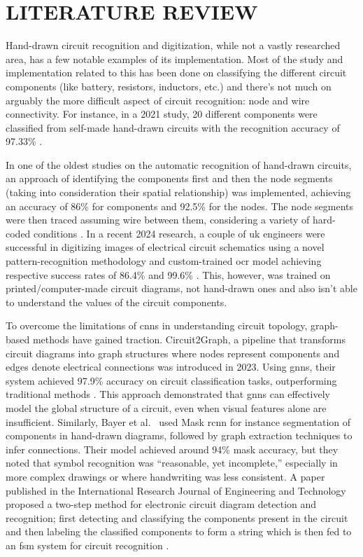 \chapter{LITERATURE REVIEW}

Hand-drawn circuit recognition and digitization, while not a vastly researched area, has a few notable examples of its implementation. Most of the study and implementation related to this has been done on classifying the different circuit components (like battery, resistors, inductors, etc.) and there's not much on arguably the more difficult aspect of circuit recognition: node and wire connectivity. For instance, in a 2021 study, 20 different components were classified from self-made hand-drawn circuits with the recognition accuracy of 97.33\% \cite{adnan2021cnnbased}.


In one of the oldest studies on the automatic recognition of hand-drawn circuits, an approach of identifying the components first and then the node segments (taking into consideration their spatial relationship) was implemented, achieving an accuracy of 86\% for components and 92.5\% for the nodes. The node segments were then traced assuming wire between them, considering a variety of hard-coded conditions \cite{edwards2000machine}. In a recent 2024 research, a couple of \gls{uk} engineers were successful in digitizing images of electrical circuit schematics using a novel pattern-recognition methodology and custom-trained \gls{ocr} model achieving respective success rates of 86.4\% and 99.6\% \cite{kelly2024digitizing}. This, however, was trained on printed/computer-made circuit diagrams, not hand-drawn ones and also isn't able to understand the values of the circuit components.



To overcome the limitations of \glspl{cnn} in understanding circuit topology, graph-based methods have gained traction. Circuit2Graph, a pipeline that transforms circuit diagrams into graph structures where nodes represent components and edges denote electrical connections was introduced in 2023. Using \glspl{gnn}, their system achieved 97.9\% accuracy on circuit classification tasks, outperforming traditional methods \cite{yamakaji2023circuit2graph}. This approach demonstrated that \glspl{gnn} can effectively model the global structure of a circuit, even when visual features alone are insufficient. Similarly, Bayer et al.\ \cite{bayer2023instance} used Mask \gls{rcnn} for instance segmentation of components in hand-drawn diagrams, followed by graph extraction techniques to infer connections. Their model achieved around 94\% mask accuracy, but they noted that symbol recognition was ``reasonable, yet incomplete,'' especially in more complex drawings or where handwriting was less consistent. A paper published in the International Research Journal of Engineering and Technology proposed a two-step method for electronic circuit diagram detection and recognition; first detecting and classifying the components present in the circuit and then labeling the classified components to form a string which is then fed to an \gls{fsm} system for circuit recognition \cite{abhinav2020electric}.




